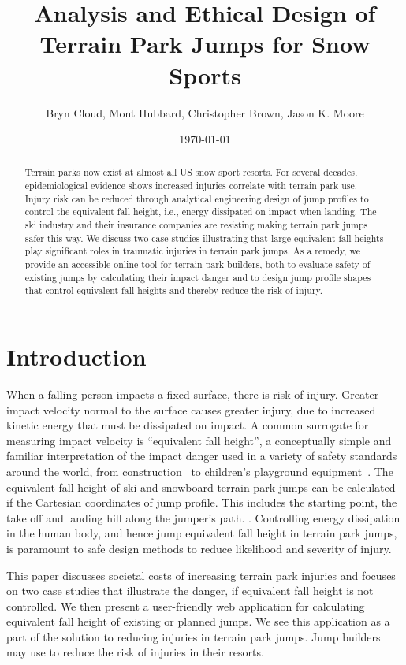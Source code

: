 \documentclass{article}
\title{Analysis and Ethical Design of Terrain Park Jumps for Snow Sports}
\author{Bryn Cloud, Mont Hubbard, Christopher Brown, Jason K. Moore}
\date{\today}
\begin{document}
\maketitle

\begin{abstract}
  Terrain parks now exist at almost all US snow sport resorts. For several
  decades, epidemiological evidence shows increased injuries correlate 
  with terrain park use. Injury risk can be reduced through analytical engineering design of jump profiles to control the equivalent fall height, i.e., energy dissipated on impact when landing. The ski industry and their insurance companies are resisting making terrain park jumps safer this way. We discuss
  two case studies illustrating that large equivalent fall heights play
  significant roles in traumatic injuries in terrain park jumps. As a remedy, we 
  provide an accessible online tool for terrain park builders, both to evaluate 
  safety of existing jumps by calculating their impact danger and to design jump 
  profile shapes that control equivalent fall heights and thereby reduce the risk of injury. 
\end{abstract}

\section{Introduction}
%
When a falling person impacts a fixed surface, there is risk of
injury. Greater impact velocity normal to the surface causes greater
injury, due to increased kinetic energy that must be dissipated on impact. A common surrogate
for measuring impact velocity is ``equivalent fall height'', a conceptually simple and 
familiar interpretation of the impact danger used in a variety of safety
standards around the world, from construction~\cite{OSHA2021} to children's
playground equipment~\cite{Chalmers1996}. The equivalent fall height of ski and
snowboard terrain park jumps can be calculated if the Cartesian coordinates of  jump profile. This includes the starting point, the take off and landing hill along the jumper's path. \cite{Hubbard2012}. Controlling energy dissipation in the human body, and hence jump equivalent fall height in terrain park jumps, is paramount to safe design methods to reduce likelihood and severity of injury. 

This paper discusses societal costs of increasing terrain park injuries
and focuses on two case studies that illustrate the danger, if
equivalent fall height is not controlled. We then present a user-friendly
web application for calculating equivalent fall height of existing or planned
jumps. We see this application as a part of the solution to reducing injuries in terrain park jumps. Jump builders may use to reduce the risk of injuries in their resorts.
\end{document}
